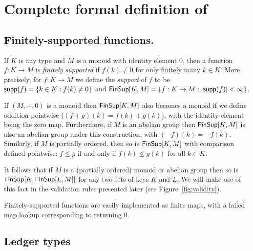 \newpage
\section{Complete formal definition of \EUTXOma}
\label{app:model}

\subsection{Finitely-supported functions.}
\label{sec:fsfs}

If $K$ is any type and $M$ is a monoid with identity element $0$, then a function $f: K \rightarrow M$ is \textit{finitely supported} if $f(k) \ne 0$ for only finitely many $k \in K$.
More precisely, for $f: K \rightarrow M$ we define the \textit{support} of $f$ to be
$\mathsf{supp}(f) = \{k \in K : f(k) \ne 0\}$
and
$\FinSup{K}{M} = \{f : K \rightarrow M : \left|\supp(f)\right| < \infty \}$.

If $(M,+,0)$ is a monoid then $\FinSup{K}{M}$ also becomes a monoid if we define addition pointwise ($(f+g)(k) = f(k) + g(k)$), with the identity element being the zero map.
Furthermore, if $M$ is an abelian group then $\FinSup{K}{M}$ is also an abelian group under this construction, with $(-f)(k) = -f(k)$.
Similarly, if $M$ is partially ordered, then so is $\FinSup{K}{M}$ with comparison defined pointwise: $f \leq g$ if and only if $f(k) \leq g(k)$ for all $k \in K$.

It follows that if $M$ is a (partially ordered) monoid or abelian group then so is $\FinSup{K}{\FinSup{L}{M}}$ for any two sets of keys $K$ and $L$.
We will make use of this fact in the validation rules presented later (see Figure~\ref{fig:validity}).

Finitely-supported functions are easily implemented as finite maps, with a failed map lookup corresponding to returning 0.

\subsection{Ledger types}

